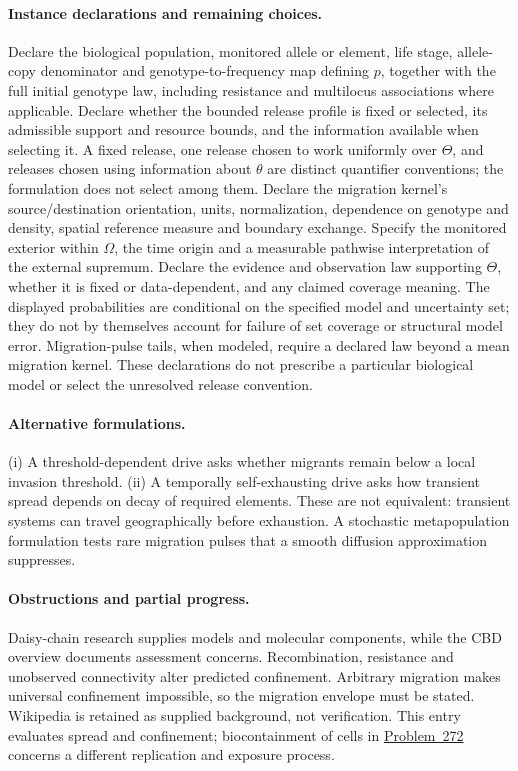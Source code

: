 \documentclass[11pt]{article}
\begin{document}
\paragraph{Instance declarations and remaining choices.} Declare the biological population, monitored allele or element, life stage, allele-copy denominator and genotype-to-frequency map defining $p$, together with the full initial genotype law, including resistance and multilocus associations where applicable. Declare whether the bounded release profile is fixed or selected, its admissible support and resource bounds, and the information available when selecting it. A fixed release, one release chosen to work uniformly over $\Theta$, and releases chosen using information about $\theta$ are distinct quantifier conventions; the formulation does not select among them. Declare the migration kernel's source/destination orientation, units, normalization, dependence on genotype and density, spatial reference measure and boundary exchange. Specify the monitored exterior within $\Omega$, the time origin and a measurable pathwise interpretation of the external supremum. Declare the evidence and observation law supporting $\Theta$, whether it is fixed or data-dependent, and any claimed coverage meaning. The displayed probabilities are conditional on the specified model and uncertainty set; they do not by themselves account for failure of set coverage or structural model error. Migration-pulse tails, when modeled, require a declared law beyond a mean migration kernel. These declarations do not prescribe a particular biological model or select the unresolved release convention.

\paragraph{Alternative formulations.} (i) A threshold-dependent drive asks whether migrants remain below a local invasion threshold. (ii) A temporally self-exhausting drive asks how transient spread depends on decay of required elements. These are not equivalent: transient systems can travel geographically before exhaustion. A stochastic metapopulation formulation tests rare migration pulses that a smooth diffusion approximation suppresses.

\paragraph{Obstructions and partial progress.} Daisy-chain research supplies models and molecular components, while the CBD overview documents assessment concerns. Recombination, resistance and unobserved connectivity alter predicted confinement. Arbitrary migration makes universal confinement impossible, so the migration envelope must be stated. Wikipedia is retained as supplied background, not verification. This entry evaluates spread and confinement; biocontainment of cells in \href{https://we-solve.github.io/problems/fail-safe-biocontainment-b18a0f1a/}{Problem~272} concerns a different replication and exposure process.
\end{document}
